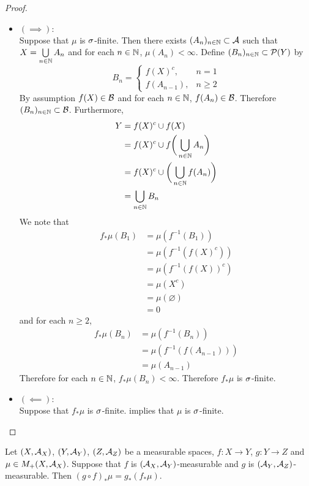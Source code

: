 \documentclass{book}
\begin{document}
\begin{proof}\
	\begin{itemize}
		\item $(\implies):$ \\
		Suppose that $\mu$ is $\sigma$-finite. Then there exists $(A_n)_{n \in \mathbb{N}} \subset \mathcal{A}$ such that $X = \bigcup\limits_{n \in \mathbb{N}} A_n$ and for each $n \in \mathbb{N}$, $\mu(A_n) < \infty$. Define $(B_n)_{n \in \mathbb{N}} \subset \mathcal{P}(Y)$ by 
		\[
		B_n = 
		\begin{cases}
			f(X)^c, & n = 1 \\
			f(A_{n-1}), & n \geq 2
		\end{cases}\]
		By assumption $f(X) \in \mathcal{B}$ and for each $n \in \mathbb{N}$, $f(A_n) \in \mathcal{B}$. Therefore $(B_n)_{n \in \mathbb{N}} \subset \mathcal{B}$. Furthermore, 
		\begin{align*}
			Y
			& = f(X)^c \cup f(X) \\
			& =  f(X)^c \cup f\bigg( \bigcup_{n \in \mathbb{N}} A_n \bigg) \\
			& =  f(X)^c \cup \bigg( \bigcup_{n \in \mathbb{N}} f(A_n) \bigg) \\
			& =  \bigcup_{n \in \mathbb{N}} B_n \\
		\end{align*}
		We note that 
		\begin{align*}
			f_*\mu(B_1)
			& = \mu(f^{-1}(B_1)) \\
			& = \mu(f^{-1} (f(X)^c)) \\
			& = \mu(f^{-1}(f(X))^c) \\
			& = \mu(X^c) \\
			& = \mu(\varnothing) \\
			& = 0
		\end{align*}
		and for each $n \geq 2$, 
		\begin{align*}
			f_*\mu(B_n) 
			& = \mu(f^{-1}(B_n)) \\
			& = \mu(f^{-1}(f(A_{n-1}))) \\ 
			& = \mu(A_{n-1})
		\end{align*}
		Therefore for each $n \in \mathbb{N}$, $f_* \mu(B_n) < \infty$. Therefore $f_*\mu$ is $\sigma$-finite.
		\item $(\impliedby):$ \\
		Suppose that $f_*\mu$ is $\sigma$-finite.  implies that $\mu$ is $\sigma$-finite.
	\end{itemize}
\end{proof}

\begin{ex} 
	Let $(X, \mathcal{A}_X)$, $(Y, \mathcal{A}_Y)$, $(Z, \mathcal{A}_Z)$ be a measurable spaces, $f: X \rightarrow Y$, $g: Y \rightarrow Z$ and $\mu \in M_+(X, \mathcal{A}_X)$. Suppose that $f$ is $(\mathcal{A}_X, \mathcal{A}_Y)$-measurable and $g$ is $(\mathcal{A}_Y, \mathcal{A}_Z)$-measurable. Then $(g \circ f)_*\mu = g_*(f_*\mu)$. 
\end{ex}
\end{document}
